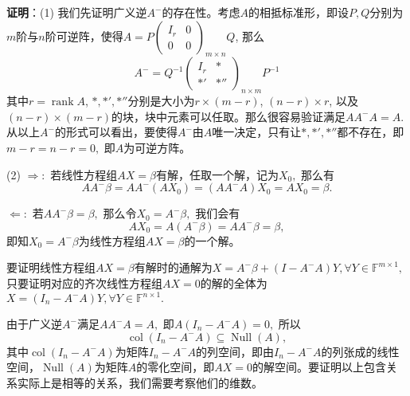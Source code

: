 \ifIncludeAnswer

\newpageorvspace

\textbf{证明}：(1) 我们先证明广义逆$A^-$的存在性。考虑$A$的相抵标准形，即设$P,Q$分别为$m$阶与$n$阶可逆阵，使得$A = P \begin{pmatrix} I_r & 0 \\ 0 & 0 \end{pmatrix}_{m\times n}\!\!\!\!\!\!\!\!\!\!\! Q$, 那么
$$A^- = Q^{-1} \begin{pmatrix} I_r & * \\ *' & *'' \end{pmatrix}_{n\times m}\!\!\!\!\!\!\!\!\!\!\! P^{-1}$$
其中$r = \operatorname{rank} A$, $*,*',*''$分别是大小为$r \times (m-r)$, $(n-r) \times r$, 以及$(n-r) \times (m-r)$的块，块中元素可以任取。那么很容易验证满足$AA^-A = A.$ 从以上$A^-$的形式可以看出，要使得$A^-$由$A$唯一决定，只有让$*,*',*''$都不存在，即$m - r = n - r = 0,$ 即$A$为可逆方阵。

(2) $\Longrightarrow:$ 若线性方程组$AX = \beta$有解，任取一个解，记为$X_0,$ 那么有
$$AA^-\beta = AA^-(AX_0) = (AA^-A)X_0 = AX_0 = \beta.$$

$\Longleftarrow:$ 若$AA^-\beta = \beta,$ 那么令$X_0 = A^-\beta,$ 我们会有
$$AX_0 = A(A^-\beta) = AA^-\beta = \beta,$$
即知$X_0 = A^-\beta$为线性方程组$AX = \beta$的一个解。

要证明线性方程组$AX = \beta$有解时的通解为$X = A^-\beta + (I - A^-A)Y, \forall Y \in \mathbb{F}^{m\times 1},$ 只要证明对应的齐次线性方程组$AX = 0$的解的全体为$X = (I_n - A^-A)Y, \forall Y \in \mathbb{F}^{n\times 1}.$

由于广义逆$A^-$满足$AA^-A = A,$ 即$A(I_n - A^-A) = 0,$ 所以
$$\operatorname{col}(I_n - A^-A) \subseteq \operatorname{Null} (A),$$
其中$\operatorname{col}(I_n - A^-A)$为矩阵$I_n - A^-A$的列空间，即由$I_n - A^-A$的列张成的线性空间，$\operatorname{Null} (A)$为矩阵$A$的零化空间，即$AX = 0$的解空间。要证明以上包含关系实际上是相等的关系，我们需要考察他们的维数。

